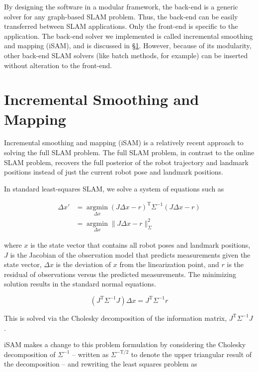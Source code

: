 \documentclass[conference]{IEEEtran}
\begin{document}
By designing the software in a modular framework, the back-end is a generic solver for any
graph-based SLAM problem. Thus, the back-end can be easily transferred between SLAM
applications. Only the front-end is specific to the application. The back-end solver we
implemented is called incremental smoothing and mapping (iSAM), and is discussed in \S\ref{sec:incrementalsmoothingandmapping}. However, because of its modularity, other back-end SLAM solvers (like
batch methods, for example) can be inserted without alteration to the front-end.


\section{Incremental Smoothing and Mapping}
\label{sec:incrementalsmoothingandmapping}


Incremental smoothing and mapping (iSAM) is a relatively recent approach to solving the
full SLAM problem. \cite{Kaess08tro} The full SLAM problem, in contrast to the online SLAM
problem, recovers the full posterior of the robot trajectory and landmark positions
instead of just the current robot pose and landmark positions. \cite{thrun2005probabilistic}

In standard least-squares SLAM, we solve a system of equations such as

\begin{align*}
  \Delta x' &= \underset{\Delta x}{\operatorname{argmin}} (J\Delta x - r)^{\text{T}}
\Sigma^{-1} (J\Delta x - r) \\
  &= \underset{\Delta x}{\operatorname{argmin}} \| J\Delta x - r \|^2_{\Sigma}
\end{align*}

where $x$ is the state vector that contains all robot poses and
landmark positions, $J$ is the Jacobian of the observation model that
predicts measurements given the state vector, $\Delta x$ is the
deviation of $x$ from the linearization point, and $r$ is the residual
of observations versus the predicted measurements. The minimizing
solution results in the standard normal equations.

\[
(J^{\text{T}} \Sigma^{-1} J) \Delta x = J^{\text{T}} \Sigma^{-1}r
\]

This is solved via the Cholesky decomposition of the information matrix,
$J^{\text{T}}\Sigma^{-1}J$.

iSAM makes a change to this problem formulation by considering the Cholesky decomposition
of $\Sigma^{-1}$ -- written as $\Sigma^{-\text{T}/2}$ to denote the upper triangular
result of the decomposition --  and rewriting the least squares problem as
\end{document}
